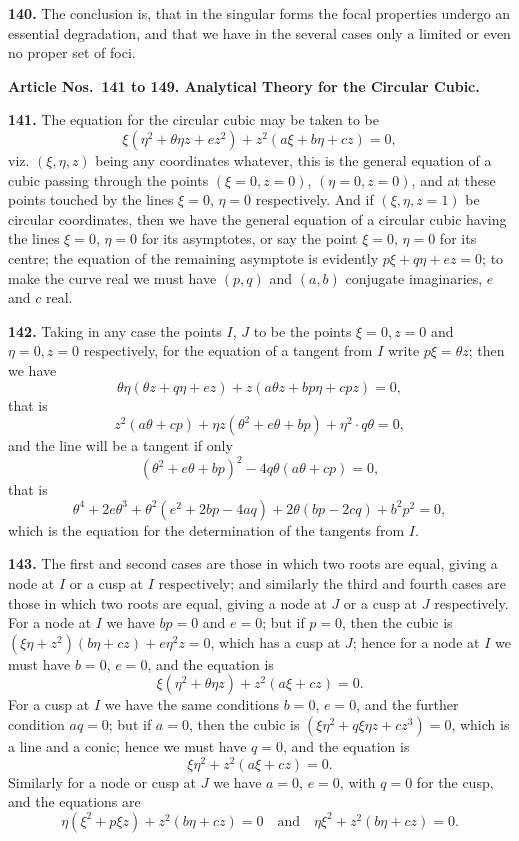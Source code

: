 \documentclass[12pt,a4paper]{article}
\theoremstyle{definition}
\begin{document}
\newpage
\noindent\textbf{140.} The conclusion is, that in the singular forms the focal properties undergo
an essential degradation, and that we have in the several cases only a limited or
even no proper set of foci.

\vspace{0.5em}
\noindent\textbf{Article Nos.~141 to 149. Analytical Theory for the Circular Cubic.}

\vspace{0.3em}
\noindent\textbf{141.} The equation for the circular cubic may be taken to be
\[
\xi(\eta^2 + \theta\eta z + ez^2) + z^2(a\xi + b\eta + cz) = 0,
\]
viz. $(\xi, \eta, z)$ being any coordinates whatever, this is the general equation of a cubic
passing through the points $(\xi = 0, z = 0)$, $(\eta = 0, z = 0)$, and at these points touched by
the lines $\xi = 0$, $\eta = 0$ respectively. And if $(\xi, \eta, z = 1)$ be circular coordinates, then we
have the general equation of a circular cubic having the lines $\xi = 0$, $\eta = 0$ for its
asymptotes, or say the point $\xi = 0$, $\eta = 0$ for its centre; the equation of the remaining
asymptote is evidently $p\xi + q\eta + ez = 0$; to make the curve real we must have $(p, q)$
and $(a, b)$ conjugate imaginaries, $e$ and $c$ real.

\noindent\textbf{142.} Taking in any case the points $I$, $J$ to be the points $\xi = 0, z = 0$ and $\eta = 0,
z = 0$ respectively, for the equation of a tangent from $I$ write $p\xi = \theta z$; then we have
\[
\theta\eta(\theta z + q\eta + ez) + z(a\theta z + bp\eta + cpz) = 0,
\]
that is
\[
z^2(a\theta + cp) + \eta z(\theta^2 + e\theta + bp) + \eta^2 \cdot q\theta = 0,
\]
and the line will be a tangent if only
\[
(\theta^2 + e\theta + bp)^2 - 4q\theta(a\theta + cp) = 0,
\]
that is
\[
\theta^4 + 2e\theta^3 + \theta^2(e^2 + 2bp - 4aq) + 2\theta(bp - 2cq) + b^2p^2 = 0,
\]
which is the equation for the determination of the tangents from $I$.

\noindent\textbf{143.} The first and second cases are those in which two roots are equal, giving
a node at $I$ or a cusp at $I$ respectively; and similarly the third and fourth cases
are those in which two roots are equal, giving a node at $J$ or a cusp at $J$ respectively.
For a node at $I$ we have $bp = 0$ and $e = 0$; but if $p = 0$, then the cubic is
$(\xi\eta + z^2)(b\eta + cz) + e\eta^2z = 0$, which has a cusp at $J$; hence for a node at $I$ we
must have $b = 0$, $e = 0$, and the equation is
\[
\xi(\eta^2 + \theta\eta z) + z^2(a\xi + cz) = 0.
\]
For a cusp at $I$ we have the same conditions $b = 0$, $e = 0$, and the further condition
$aq = 0$; but if $a = 0$, then the cubic is $(\xi\eta^2 + q\xi\eta z + cz^3) = 0$, which is a line and
a conic; hence we must have $q = 0$, and the equation is
\[
\xi\eta^2 + z^2(a\xi + cz) = 0.
\]
Similarly for a node or cusp at $J$ we have $a = 0$, $e = 0$, with $q = 0$ for the cusp,
and the equations are
\[
\eta(\xi^2 + p\xi z) + z^2(b\eta + cz) = 0 \quad\text{and}\quad \eta\xi^2 + z^2(b\eta + cz) = 0.
\]
\end{document}
